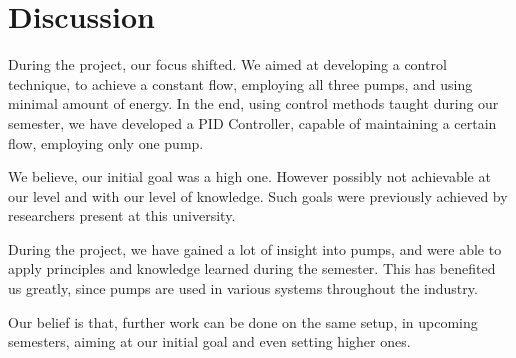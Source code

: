 \chapter{Discussion}\label{ch:discussion}

During the project, our focus shifted. We aimed at developing a control technique, to achieve a constant flow, employing
all three pumps, and using minimal amount of energy. In the end, using control methods taught during our semester, we have
developed a PID Controller, capable of maintaining a certain flow, employing only one pump.

We believe, our initial goal was a high one. However possibly not achievable at our level and with our level of knowledge.
Such goals were previously achieved by researchers present at this university. 

During the project, we have gained a lot of insight into pumps, and were able to apply principles and knowledge
learned during the semester. This has benefited us greatly, since pumps are used in various systems throughout the industry.

Our belief is that, further work can be done on the same setup, in upcoming semesters, aiming at our initial goal and
even setting higher ones. 


